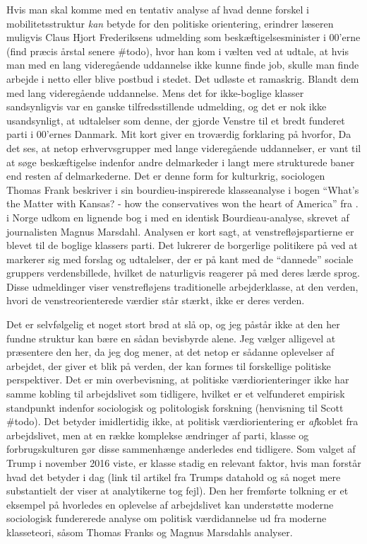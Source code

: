 Hvis man skal komme med en tentativ analyse af hvad denne forskel i mobilitetsstruktur \emph{kan} betyde for den politiske orientering, erindrer læseren muligvis Claus Hjort Frederiksens udmelding som beskæftigelsesminister i 00'erne (find præcis årstal senere \#todo), hvor han kom i vælten ved at udtale, at hvis man med en lang videregående uddannelse ikke kunne finde job, skulle man finde arbejde i netto eller blive postbud i stedet. Det udløste et ramaskrig. Blandt dem med lang videregående uddannelse. Mens det for ikke-boglige klasser sandsynligvis var en ganske tilfredsstillende udmelding, og det er nok ikke usandsynligt, at udtalelser som denne, der gjorde Venstre til et bredt funderet parti i 00'ernes Danmark. Mit kort giver en troværdig forklaring på hvorfor, Da det ses, at netop erhvervsgrupper med lange videregående uddannelser, er vant til at søge beskæftigelse indenfor andre delmarkeder i langt mere strukturede baner end resten af delmarkederne. Det er denne form for kulturkrig, sociologen Thomas Frank beskriver i sin bourdieu-inspirerede klasseanalyse i bogen “What's the Matter with Kansas? - how the conservatives won the heart of America” fra \citeyear{Frank2007}. i Norge udkom en lignende bog i \citeyear{Marsdal2007} med en identisk Bourdieau-analyse, skrevet af journalisten Magnus  Marsdahl. Analysen er kort sagt, at venstrefløjspartierne er blevet til de boglige klassers parti. Det lukrerer de borgerlige politikere på ved at markerer sig med forslag og udtalelser, der er på kant med de “dannede” sociale gruppers verdensbillede, hvilket de naturligvis reagerer på med deres lærde sprog. Disse udmeldinger viser venstrefløjens traditionelle arbejderklasse, at den verden, hvori de venstreorienterede værdier står stærkt, ikke er deres verden. 

Det er selvfølgelig et noget stort brød at slå op, og jeg påstår ikke at den her fundne struktur kan bære en sådan bevisbyrde alene. Jeg vælger alligevel at præsentere den her, da jeg dog mener, at det netop er sådanne oplevelser af arbejdet, der giver et blik på verden, der kan formes til forskellige politiske perspektiver. Det er min overbevisning, at politiske værdiorienteringer ikke har samme kobling til arbejdslivet som tidligere, hvilket er et velfunderet empirisk standpunkt indenfor sociologisk og politologisk forskning (henvisning til Scott \#todo). Det betyder imidlertidig ikke, at politisk værdiorientering er \emph{af}koblet fra arbejdslivet, men at en række komplekse ændringer af parti, klasse og forbrugskulturen gør disse sammenhænge anderledes end tidligere. Som valget af Trump i november 2016 viste, er klasse stadig en relevant faktor, hvis man forstår hvad det betyder i dag (link til artikel fra Trumps datahold og så noget mere substantielt der viser at analytikerne tog fejl). Den her fremførte tolkning er et eksempel på hvorledes en oplevelse af arbejdslivet kan understøtte moderne sociologisk fundererede analyse om politisk værdidannelse ud fra moderne klasseteori, såsom Thomas Franks og Magnus Marsdahls analyser.



